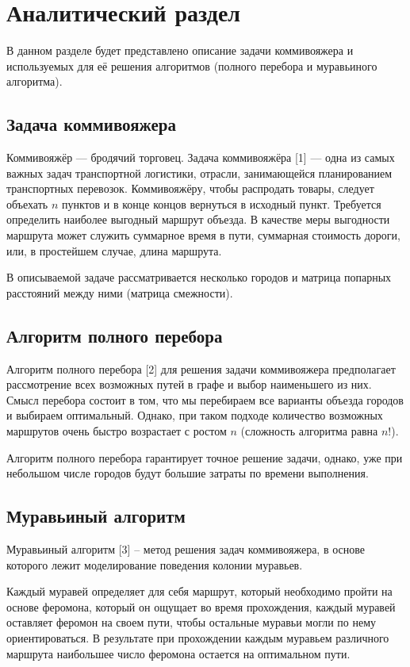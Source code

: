 \chapter{Аналитический раздел}\label{analyth}

В данном разделе будет представлено описание задачи коммивояжера и используемых для её решения алгоритмов (полного перебора и муравьиного алгоритма).

\section{Задача коммивояжера}


Коммивояжёр — бродячий торговец. Задача коммивояжёра [1] — одна из самых важных задач транспортной логистики, отрасли, занимающейся планированием транспортных перевозок. Коммивояжёру, чтобы распродать товары, следует объехать $n$ пунктов и в конце концов вернуться в исходный пункт. Требуется определить наиболее выгодный маршрут объезда. В качестве меры выгодности маршрута может служить суммарное время в пути, суммарная стоимость дороги, или, в простейшем случае, длина маршрута.

В описываемой задаче рассматривается несколько городов и матрица попарных расстояний между ними (матрица смежности).


\section{Алгоритм полного перебора}


Алгоритм полного перебора [2] для решения задачи коммивояжера предполагает рассмотрение всех возможных путей в графе и выбор наименьшего из них. Смысл перебора состоит в том, что мы перебираем все варианты объезда городов и выбираем оптимальный. Однако, при таком подходе количество возможных маршрутов очень быстро возрастает с ростом $n$ (сложность алгоритма равна $n!$).

Алгоритм полного перебора гарантирует точное решение задачи, однако, уже при небольшом числе городов будут большие затраты по времени выполнения.

\section{Муравьиный алгоритм}


Муравьиный алгоритм [3] -- метод решения задач коммивояжера, в основе которого лежит моделирование поведения колонии муравьев.

Каждый муравей определяет для себя маршрут, который необходимо пройти на основе феромона, который он ощущает во время прохождения, каждый муравей оставляет феромон на своем пути, чтобы остальные муравьи могли по нему ориентироваться. В результате при прохождении каждым муравьем различного маршрута наибольшее число феромона остается на оптимальном пути.


